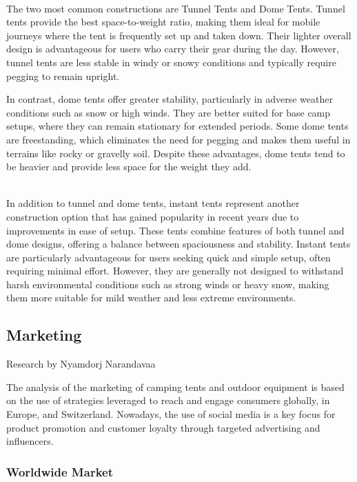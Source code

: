 \documentclass{article}
\begin{document}
\\

The two most common constructions are Tunnel Tents and Dome Tents. 
Tunnel tents provide the best space-to-weight ratio, making them ideal for mobile journeys
where the tent is frequently set up and taken down. Their lighter overall design is
advantageous for users who carry their gear during the day. However, tunnel tents are less
stable in windy or snowy conditions and typically require pegging to remain upright.

In contrast, dome tents offer greater stability, particularly in adverse weather conditions
such as snow or high winds. They are better suited for base camp setups, where they can
remain stationary for extended periods. Some dome tents are freestanding, which eliminates
the need for pegging and makes them useful in terrains like rocky or gravelly soil. Despite
these advantages, dome tents tend to be heavier and provide less space for the weight they
add.

\\

In addition to tunnel and dome tents, instant tents represent another construction option
that has gained popularity in recent years due to improvements in ease of setup. These
tents combine features of both tunnel and dome designs, offering a balance between
spaciousness and stability. Instant tents are particularly advantageous for users seeking
quick and simple setup, often requiring minimal effort. However, they are generally not
designed to withstand harsh environmental conditions such as strong winds or heavy snow,
making them more suitable for mild weather and less extreme environments.


\subsection{Marketing}
{\small Research by Nyamdorj Narandavaa}

The analysis of the marketing of camping tents and outdoor equipment is based on the use
of strategies leveraged to reach and engage consumers globally, in Europe, and Switzerland.
Nowadays, the use of social media is a key focus for product promotion and customer loyalty
through targeted advertising and influencers.

\subsubsection{Worldwide Market}
\end{document}
